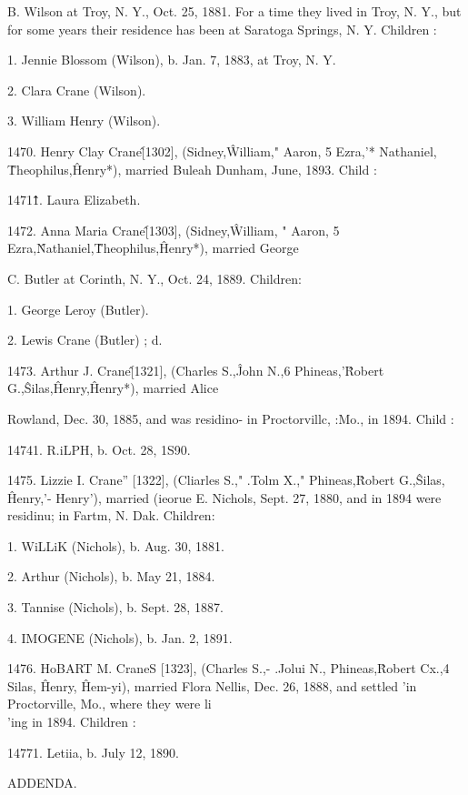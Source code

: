 B. Wilson at Troy, N. Y., Oct. 25, 1881. For a time they lived 
in Troy, N. Y., but for some years their residence has been at 
Saratoga Springs, N. Y. Children : 

1. Jennie Blossom (Wilson), b. Jan. 7, 1883, at Troy, N. Y. 

2. Clara Crane (Wilson). 

3. William Henry (Wilson). 

1470. Henry Clay Crane\^ [1302], (Sidney,\^ William," 
Aaron, 5 Ezra,'* Nathaniel, \^ Theophilus,\^ Henry*), married Buleah 
Dunham, June, 1893. Child : 

1471\^  \^1. Laura Elizabeth. 

1472. Anna Maria Crane\^ [1303], (Sidney,\^ William, " 
Aaron, 5 Ezra,\^ Nathaniel,\^ Theophilus,\^ Henry*), married George 

C. Butler at Corinth, N. Y., Oct. 24, 1889. Children: 

1. George Leroy (Butler). 

2. Lewis Crane (Butler) ; d. 

1473. Arthur J. Crane\^ [1321], (Charles S.,\^ John N.,6 
Phineas,'\^ Robert G.,\^ Silas,\^ Henry,\^ Henry*), married Alice 




Rowland, Dec. 30, 1885, and was residino- in Proctorvillc, :Mo., 
in 1894. Child : 

14741. R.iLPH, b. Oct. 28, 1S90. 

1475. Lizzie I. Crane'' [1322], (Cliarles S.," .Tolm X.," 
Phineas,\^ Robert G.,\^ Silas, \^ Henry,'- Henry'), married (ieorue 
E. Nichols, Sept. 27, 1880, and in 1894 were residinu; in Fartm, 
N. Dak. Children: 

1. WiLLiK (Nichols), b. Aug. 30, 1881. 

2. Arthur (Nichols), b. May 21, 1884. 

3. Tannise (Nichols), b. Sept. 28, 1887. 

4. IMOGENE (Nichols), b. Jan. 2, 1891. 

1476. HoBART M. CraneS [1323], (Charles S.,- .Jolui N., 
Phineas,\^ Robert Cx.,4 Silas, \^ Henry, \^ Hem-yi), married Flora 
Nellis, Dec. 26, 1888, and settled 'in Proctorville, Mo., where 
they were li\\'ing in 1894. Children : 

14771. Letiia, b. July 12, 1890. 



ADDENDA. 



